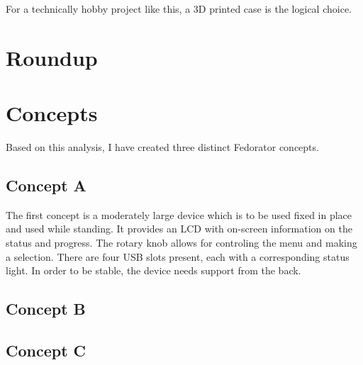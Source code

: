             For a technically hobby project like this, a 3D printed case is the logical choice.
    \section{Roundup}
        \blind[2]
    \section{Concepts}
        Based on this analysis, I have created three distinct Fedorator concepts.
        \subsection{Concept A}
            The first concept is a moderately large device which is to be used fixed in place and used while standing.  It provides an LCD with on-screen information on the status and progress.  The rotary knob allows for controling the menu and making a selection.  There are four USB slots present, each with a corresponding status light.  In order to be stable, the device needs support from the back.
            
            \blind[1]
        \subsection{Concept B}
            \blind[2]
        \subsection{Concept C}
            \blind[2]
